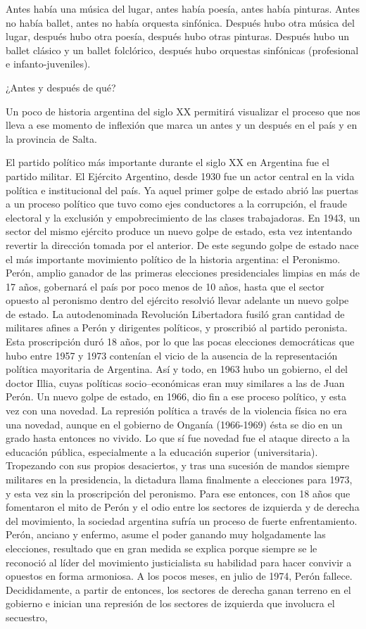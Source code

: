 Antes había una música del lugar, antes había poesía, antes había pinturas. Antes no había ballet, antes no había orquesta sinfónica. Después hubo otra música del lugar, después hubo otra poesía, después hubo otras pinturas. Después hubo un ballet clásico y un ballet folclórico, después hubo orquestas sinfónicas (profesional e infanto-juveniles).

¿Antes y después de qué?

Un poco de historia argentina del siglo XX permitirá visualizar el
proceso que nos lleva a ese momento de inflexión que marca un antes y un después en el país y en la provincia de Salta.

El partido político más importante durante el siglo XX en Argentina fue el partido militar. El Ejército Argentino, desde 1930 fue un actor central en la vida política e institucional del país. Ya aquel primer golpe de estado abrió las puertas a un proceso político que tuvo como ejes conductores a la corrupción, el fraude electoral y la exclusión y empobrecimiento de las clases trabajadoras. En 1943, un sector del mismo ejército produce un nuevo golpe de estado, esta vez intentando revertir la dirección tomada por el anterior. De este segundo golpe de estado nace el más importante movimiento político de la historia argentina: el Peronismo. Perón, amplio ganador de las primeras elecciones presidenciales limpias en más de 17 años, gobernará el país por poco menos de 10 años, hasta que el sector opuesto al peronismo dentro del ejército resolvió llevar adelante un nuevo golpe de estado. La autodenominada Revolución Libertadora fusiló gran cantidad de militares afines a Perón y dirigentes políticos, y proscribió al partido peronista. Esta proscripción duró 18 años, por lo que las pocas elecciones democráticas que hubo entre 1957 y 1973 contenían el vicio de la ausencia de la representación política mayoritaria de Argentina. Así y todo, en 1963 hubo un gobierno, el del doctor Illia, cuyas políticas socio--económicas eran muy similares a las de Juan Perón. Un nuevo golpe de estado, en 1966, dio fin a ese proceso político, y esta vez con una novedad. La represión política a través de la violencia física no era una novedad, aunque en el gobierno de Onganía (1966-1969) ésta se dio en un grado hasta entonces no vivido. Lo que sí fue novedad fue el ataque directo a la educación pública, especialmente a la educación superior (universitaria). Tropezando con sus propios desaciertos, y tras una sucesión de mandos siempre militares en la presidencia, la dictadura llama finalmente a elecciones para 1973, y esta vez sin la proscripción del peronismo. Para ese entonces, con 18 años que fomentaron el mito de Perón y el odio entre los sectores de izquierda y de derecha del movimiento, la sociedad argentina sufría un proceso de fuerte enfrentamiento. Perón, anciano y enfermo, asume el poder ganando muy holgadamente las elecciones, resultado que en gran medida se explica porque siempre se le reconoció al líder del movimiento justicialista su habilidad para hacer convivir a opuestos en forma armoniosa. A los pocos meses, en julio de 1974, Perón fallece. Decididamente, a partir de entonces, los sectores de derecha ganan terreno en el gobierno e inician una represión de los sectores de izquierda que involucra el secuestro, 